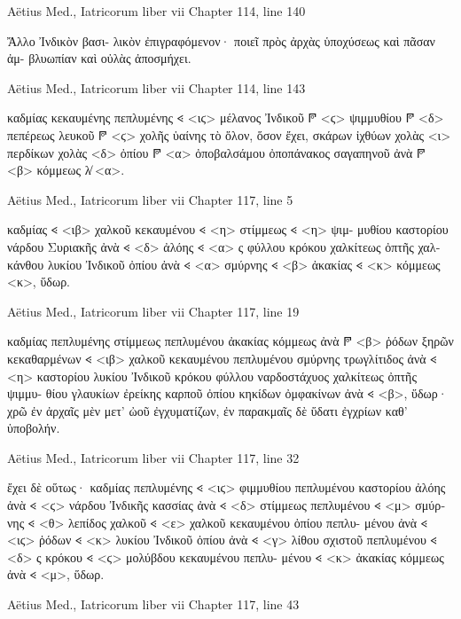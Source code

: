 \documentclass[12pt,letterpaper,twoside,final]{memoir}
\begin{document}
\begin{greek}
Aëtius Med., Iatricorum liber vii 
Chapter 114, line 140

                                                                  Ἄλλο Ἰνδικὸν βασι-
λικὸν ἐπιγραφόμενον· ποιεῖ πρὸς ἀρχὰς ὑποχύσεως καὶ πᾶσαν ἀμ-
βλυωπίαν καὶ οὐλὰς ἀποσμήχει. 



Aëtius Med., Iatricorum liber vii 
Chapter 114, line 143

                                      καδμίας κεκαυμένης πεπλυμένης 𐅻 <ιϛ> 
μέλανος Ἰνδικοῦ 𐆄 <ϛ> ψιμμυθίου 𐆄 <δ> πεπέρεως λευκοῦ 𐆄 <ϛ> χολῆς ὑαίνης 
τὸ ὅλον, ὅσον ἔχει, σκάρων ἰχθύων χολὰς <ι> περδίκων χολὰς <δ> ὀπίου 
𐆄 <α> ὀποβαλσάμου ὀποπάνακος σαγαπηνοῦ ἀνὰ 𐆄 <β> κόμμεως λ̸ <α>. 



Aëtius Med., Iatricorum liber vii 
Chapter 117, line 5

           καδμίας 𐅻 <ιβ> χαλκοῦ κεκαυμένου 𐅻 <η> στίμμεως 𐅻 <η> ψιμ-  
μυθίου καστορίου νάρδου Συριακῆς ἀνὰ 𐅻 <δ> ἀλόης 𐅻 <α> ς φύλλου 
κρόκου χαλκίτεως ὀπτῆς χαλκάνθου λυκίου Ἰνδικοῦ ὀπίου ἀνὰ 𐅻 <α> 
σμύρνης 𐅻 <β> ἀκακίας 𐅻 <κ> κόμμεως <κ>, ὕδωρ. 



Aëtius Med., Iatricorum liber vii 
Chapter 117, line 19

                             καδμίας πεπλυμένης στίμμεως πεπλυμένου 
ἀκακίας κόμμεως ἀνὰ 𐆄 <β> ῥόδων ξηρῶν κεκαθαρμένων 𐅻 <ιβ> χαλκοῦ 
κεκαυμένου πεπλυμένου σμύρνης τρωγλίτιδος ἀνὰ 𐅻 <η> καστορίου 
λυκίου Ἰνδικοῦ κρόκου φύλλου ναρδοστάχυος χαλκίτεως ὀπτῆς ψιμμυ-
θίου γλαυκίων ἐρείκης καρποῦ ὀπίου κηκίδων ὀμφακίνων ἀνὰ 𐅻 <β>, 
ὕδωρ· χρῶ ἐν ἀρχαῖς μὲν μετ' ὠοῦ ἐγχυματίζων, ἐν παρακμαῖς δὲ 
ὕδατι ἐγχρίων καθ' ὑποβολήν. 



Aëtius Med., Iatricorum liber vii 
Chapter 117, line 32

                                                                       ἔχει δὲ 
οὕτως· καδμίας πεπλυμένης 𐅻 <ιϛ> φιμμυθίου πεπλυμένου καστορίου 
ἀλόης ἀνὰ 𐅻 <ϛ> νάρδου Ἰνδικῆς κασσίας ἀνὰ 𐅻 <δ> στίμμεως πεπλυμένου 
𐅻 <μ> σμύρνης 𐅻 <θ> λεπίδος χαλκοῦ 𐅻 <ε> χαλκοῦ κεκαυμένου ὀπίου πεπλυ-
μένου ἀνὰ 𐅻 <ιϛ> ῥόδων 𐅻 <κ> λυκίου Ἰνδικοῦ ὀπίου ἀνὰ 𐅻 <γ> λίθου 
σχιστοῦ πεπλυμένου 𐅻 <δ> ς κρόκου 𐅻 <ϛ> μολύβδου κεκαυμένου πεπλυ-
μένου 𐅻 <κ> ἀκακίας κόμμεως ἀνὰ 𐅻 <μ>, ὕδωρ. 



Aëtius Med., Iatricorum liber vii 
Chapter 117, line 43


\end{greek}
\end{document}
